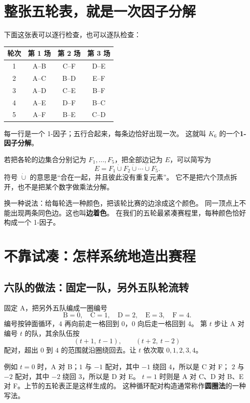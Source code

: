 \documentclass[UTF8,11pt,fontset=none]{ctexart}
\begin{document}
\section{整张五轮表，就是一次因子分解}
下面这张表可以逐行检查，也可以逐队检查：
\begin{center}
\begin{tabular}{cccc}
\toprule
轮次 & 第 1 场 & 第 2 场 & 第 3 场\\\midrule
1 & A--B & C--F & D--E\\
2 & A--C & B--D & E--F\\
3 & A--D & C--E & B--F\\
4 & A--E & D--F & B--C\\
5 & A--F & B--E & C--D\\\bottomrule
\end{tabular}
\end{center}
每一行是一个 1-因子；五行合起来，每条边恰好出现一次。
这就叫 $K_6$ 的一个\textbf{1-因子分解}。

若把各轮的边集合分别记为 $F_1,\dots,F_5$，把全部边记为 $E$，可以简写为
\[
E=F_1\mathbin{\dot\cup}F_2\mathbin{\dot\cup}\cdots\mathbin{\dot\cup}F_5.
\]
符号 $\dot\cup$ 的意思是“合在一起，并且彼此没有重复元素”。
它不是把六个顶点拆开，也不是把某个数字做乘法分解。

换一种说法：给每轮选一种颜色，把该轮比赛的边涂成这个颜色。
同一顶点上不能出现两条同色边。这也叫\textbf{边着色}。
在我们的五轮最紧凑赛程里，每种颜色恰好构成一个 1-因子。

\section{不靠试凑：怎样系统地造出赛程}
\subsection{六队的做法：固定一队，另外五队轮流转}
固定 A，把另外五队编成一圈编号
\[
\text{B}=0,\quad\text{C}=1,\quad\text{D}=2,\quad\text{E}=3,\quad\text{F}=4.
\]
编号按钟面循环，$4$ 再向前走一格回到 $0$，$0$ 向后走一格回到 $4$。
第 $t$ 步让 A 对编号 $t$ 的队，其余队伍按
\[
(t+1,\ t-1),\qquad(t+2,\ t-2)
\]
配对，超出 $0$ 到 $4$ 的范围就沿圈绕回去。让 $t$ 依次取 $0,1,2,3,4$。

例如 $t=0$ 时，A 对 B；$1$ 与 $-1$ 配对，其中 $-1$ 绕回 $4$，所以是 C 对 F；
$2$ 与 $-2$ 配对，其中 $-2$ 绕回 $3$，所以是 D 对 E。
$t=1$ 时则是 A 对 C、D 对 B、E 对 F。上节的五轮表正是这样生成的。
这种循环配对构造通常称作\textbf{圆圈法}的一种写法。
\end{document}
